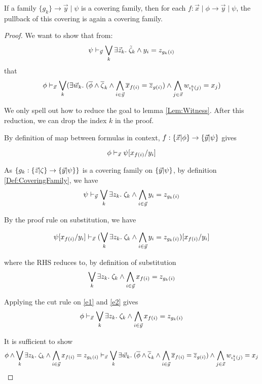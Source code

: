 \begin{lemma}\label{Lemma:stabCovFam}
  If a family $\{g_k\}\to \vec{y}\mid \psi$ is a covering family, 
  then for each $f: \vec{x}\mid \phi\to \vec{y}\mid\psi$, the pullback of this covering is again a covering family.
\end{lemma}
\begin{proof}
  We want to show that from:
  \[\psi\vdash_{\vec{y}} \bigvee_k \exists \vec{z}_k.\; \tilde{\zeta}_k\land y_i = z_{g_k(i)}\]
  that 
  \[\phi \vdash_{\vec{x}} \bigvee_k (\exists\vec{w}_k.\;(\overline{\phi}\land \overline{\zeta}_k \land\bigwedge_{i\in \vec{y}} \overline{x}_{f(i)} = \overline{z}_{g(i)}) \land \bigwedge_{j\in\vec{x}}w_{{\iota^k_1(j)}} = x_j )\]

  We only spell out how to reduce the goal to lemma \ref{Lem:Witness}. After this reduction, we can drop the index $k$ in the proof.

  By definition of map between formulas in context, $f:\{ \vec{x} | \phi \}\to \{ \vec{y} | \psi \}$ gives

  \begin{equation}\label{e1}
   \phi\vdash_{\vec{x}} \psi[x_{f(i)}/y_i]
  \end{equation}
   

  As $\{g_k:\{ \vec{z} | \zeta \}\to \{ \vec{y} | \psi \}\}$ is a covering family on $\{ \vec{y} | \psi \}$, by definition \ref{Def:CoveringFamily}, we have 
  \[\psi\vdash_{\vec{y}} \bigvee_k \exists z_k.\;\zeta_k \land \bigwedge_{i\in \vec{y}} y_i = z_{g_k(i)}\]

  By the proof rule on substitution, we have 

  
  \begin{equation}\label{e2}
  \psi [x_{f(i)}/y_i]\vdash_{\vec{x}} (\bigvee_k \exists z_k.\;\zeta_k \land \bigwedge_{i\in \vec{y}} y_i = z_{g_k(i)})  [x_{f(i)}/y_i]
  \end{equation}

  
  where the RHS reduces to, by definition of substitution
  \[\bigvee_k \exists z_k.\;\zeta_k \land \bigwedge_{i\in \vec{y}} x_{f(i)} = z_{g_k(i)}\]
  
  Applying the cut rule on \ref{e1} and \ref{e2} gives
  \[\phi\vdash_{\vec{x}} \bigvee_k \exists z_k.\;\zeta_k \land \bigwedge_{i\in \vec{y}} x_{f(i)} = z_{g_k(i)}\]

  It is sufficient to show
  \begin{equation*}
    \phi\land \bigvee_k \exists z_k.\;\zeta_k \land \bigwedge_{i\in \vec{y}} x_{f(i)} = z_{g_k(i)}\vdash_{\vec{x}}
      \bigvee_k \exists \vec{w}_k. \;(\overline{\phi}\land \overline{\zeta}_k \land\bigwedge_{i\in \vec{y}} \overline{x}_{f(i)} = \overline{z}_{g(i)}) \land \bigwedge_{j\in\vec{x}}w_{{\iota^k_1(j)}} = x_j  
  \end{equation*}


\end{proof}
